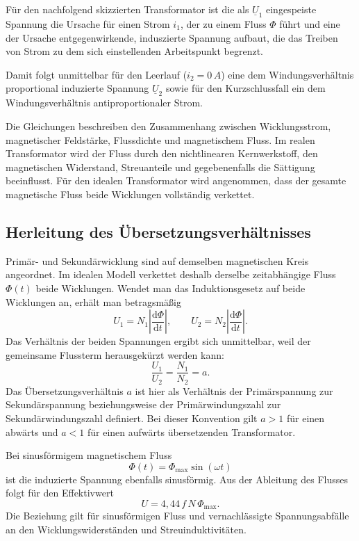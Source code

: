 Für den nachfolgend skizzierten Transformator ist die als $\underline{U}_1$
eingespeiste Spannung die Ursache für einen Strom $i_1$, der zu einem Fluss
$\Phi$ führt und eine der Ursache entgegenwirkende, induszierte Spannung
aufbaut, die das Treiben von Strom zu dem sich einstellenden Arbeitspunkt begrenzt.

\vspace{-1.1em}
\begin{center}

\end{center}

Damit folgt unmittelbar für den Leerlauf ($i_2 = 0\,A$) eine
dem Windungsverhältnis proportional induzierte Spannung $\underline{U}_2$
sowie für den Kurzschlussfall ein dem Windungsverhältnis antiproportionaler
Strom.

Die Gleichungen beschreiben den Zusammenhang zwischen
Wicklungsstrom, magnetischer Feldstärke, Flussdichte und
magnetischem Fluss. Im realen Transformator wird der Fluss durch
den nichtlinearen Kernwerkstoff, den magnetischen Widerstand,
Streuanteile und gegebenenfalls die Sättigung beeinflusst. Für
den idealen Transformator wird angenommen, dass der gesamte
magnetische Fluss beide Wicklungen vollständig verkettet.

\subsection{Herleitung des Übersetzungsverhältnisses}

Primär- und Sekundärwicklung sind auf demselben magnetischen
Kreis angeordnet. Im idealen Modell verkettet deshalb derselbe
zeitabhängige Fluss $\Phi(t)$ beide Wicklungen. Wendet man das
Induktionsgesetz auf beide Wicklungen an, erhält man betragsmäßig
\[
    U_1 = N_1 \left|\frac{\mathrm d\Phi}{\mathrm dt}\right|,
    \qquad
    U_2 = N_2 \left|\frac{\mathrm d\Phi}{\mathrm dt}\right|.
\]
Das Verhältnis der beiden Spannungen ergibt sich unmittelbar,
weil der gemeinsame Flussterm herausgekürzt werden kann:
\[
    \boxed{\frac{U_1}{U_2}=\frac{N_1}{N_2}=a.}
\]
Das Übersetzungsverhältnis $a$ ist hier als Verhältnis der
Primärspannung zur Sekundärspannung beziehungsweise der
Primärwindungszahl zur Sekundärwindungszahl definiert. Bei dieser
Konvention gilt $a>1$ für einen abwärts und $a<1$ für einen
aufwärts übersetzenden Transformator.

Bei sinusförmigem magnetischem Fluss
\[
    \Phi(t)=\Phi_{\max}\sin(\omega t)
\]
ist die induzierte Spannung ebenfalls sinusförmig. Aus der
Ableitung des Flusses folgt für den Effektivwert
\[
    \boxed{U=4{,}44\,f\,N\,\Phi_{\max}.}
\]
Die Beziehung gilt für sinusförmigen Fluss und vernachlässigte
Spannungsabfälle an den Wicklungswiderständen und Streuinduktivitäten.

